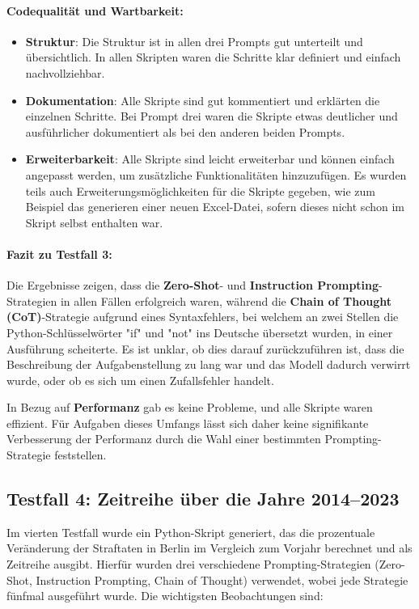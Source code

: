 \documentclass[11pt,a4paper]{article}
\begin{document}
\paragraph{Codequalität und Wartbarkeit:}
\begin{itemize}
    \item \textbf{Struktur}: Die Struktur ist in allen drei Prompts gut unterteilt und übersichtlich. In allen Skripten waren die Schritte klar definiert und einfach nachvollziehbar.
    \item \textbf{Dokumentation}: Alle Skripte sind gut kommentiert und erklärten die einzelnen Schritte. Bei Prompt drei waren die Skripte etwas deutlicher und ausführlicher dokumentiert als bei den anderen beiden Prompts.
    \item \textbf{Erweiterbarkeit}: Alle Skripte sind leicht erweiterbar und können einfach angepasst werden, um zusätzliche Funktionalitäten hinzuzufügen. Es wurden teils auch Erweiterungsmöglichkeiten für die Skripte gegeben, wie zum Beispiel das generieren einer neuen Excel-Datei, sofern dieses nicht schon im Skript selbst enthalten war. 
\end{itemize}

\paragraph{Fazit zu Testfall 3:}
Die Ergebnisse zeigen, dass die \textbf{Zero-Shot}- und \textbf{Instruction Prompting}-Strategien in allen Fällen erfolgreich waren, während die \textbf{Chain of Thought (CoT)}-Strategie aufgrund eines Syntaxfehlers, bei welchem an zwei Stellen die Python-Schlüsselwörter "if" und "not" ins Deutsche übersetzt wurden, in einer Ausführung scheiterte. Es ist unklar, ob dies darauf zurückzuführen ist, dass die Beschreibung der Aufgabenstellung zu lang war und das Modell dadurch verwirrt wurde, oder ob es sich um einen Zufallsfehler handelt.

In Bezug auf \textbf{Performanz} gab es keine Probleme, und alle Skripte waren effizient. Für Aufgaben dieses Umfangs lässt sich daher keine signifikante Verbesserung der Performanz durch die Wahl einer bestimmten Prompting-Strategie feststellen.

\subsection{Testfall 4: Zeitreihe über die Jahre 2014--2023}
\label{subsec:auswertung_testfall4}

Im vierten Testfall wurde ein Python-Skript generiert, das die prozentuale Veränderung der Straftaten in Berlin im Vergleich zum Vorjahr berechnet und als Zeitreihe ausgibt. Hierfür wurden drei verschiedene Prompting-Strategien (Zero-Shot, Instruction Prompting, Chain of Thought) verwendet, wobei jede Strategie fünfmal ausgeführt wurde. Die wichtigsten Beobachtungen sind:
\end{document}
